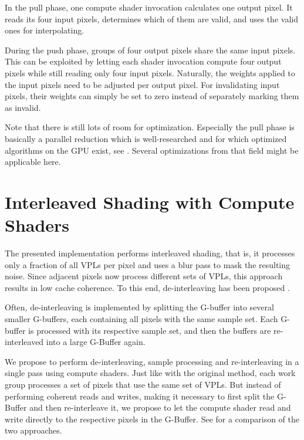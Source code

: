 In the pull phase, one compute shader invocation calculates one output pixel. It reads its four input pixels, determines which of them are valid, and uses the valid ones for interpolating.


During the push phase, groups of four output pixels share the same input pixels. This can be exploited by letting each shader invocation compute four output pixels while still reading only four input pixels. Naturally, the weights applied to the input pixels need to be adjusted per output pixel. For invalidating input pixels, their weights can simply be set to zero instead of separately marking them as invalid.

Note that there is still lots of room for optimization. Especially the pull phase is basically a parallel reduction which is well-researched and for which optimized algorithms on the GPU exist, see  \citet{Harris:2007:ParallelReduction}. Several optimizations from that field might be applicable here.



\section{Interleaved Shading with Compute Shaders}
\label{sec:impl:interleavedShading}

The presented implementation performs interleaved shading, that is, it processes only a fraction of all VPLs per pixel and uses a blur pass to mask the resulting noise. Since adjacent pixels now process different sets of VPLs, this approach results in low cache coherence. To this end, de-interleaving has been proposed \citep{segovia2006non}.

Often, de-interleaving is implemented by splitting the G-buffer into several smaller G-buffers, each containing all pixels with the same sample set. Each G-buffer is processed with its respective sample set, and then the buffers are re-interleaved into a large G-Buffer again.

We propose to perform de-interleaving, sample processing and re-interleaving in a single pass using compute shaders. Just like with the original method, each work group processes a set of pixels that use the same set of VPLs. But instead of performing coherent reads and writes, making it necessary to first split the G-Buffer and then re-interleave it, we propose to let the compute shader read and write directly to the respective pixels in the G-Buffer. See  for a comparison of the two approaches.

